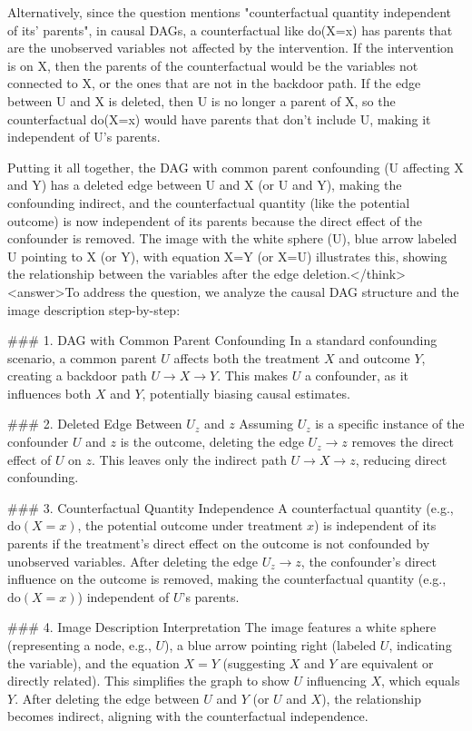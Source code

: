 Alternatively, since the question mentions "counterfactual quantity independent of its' parents", in causal DAGs, a counterfactual like do(X=x) has parents that are the unobserved variables not affected by the intervention. If the intervention is on X, then the parents of the counterfactual would be the variables not connected to X, or the ones that are not in the backdoor path. If the edge between U and X is deleted, then U is no longer a parent of X, so the counterfactual do(X=x) would have parents that don't include U, making it independent of U's parents.

Putting it all together, the DAG with common parent confounding (U affecting X and Y) has a deleted edge between U and X (or U and Y), making the confounding indirect, and the counterfactual quantity (like the potential outcome) is now independent of its parents because the direct effect of the confounder is removed. The image with the white sphere (U), blue arrow labeled U pointing to X (or Y), with equation X=Y (or X=U) illustrates this, showing the relationship between the variables after the edge deletion.</think><answer>To address the question, we analyze the causal DAG structure and the image description step-by-step:  

### 1. DAG with Common Parent Confounding  
In a standard confounding scenario, a common parent \( U \) affects both the treatment \( X \) and outcome \( Y \), creating a backdoor path \( U \rightarrow X \rightarrow Y \). This makes \( U \) a confounder, as it influences both \( X \) and \( Y \), potentially biasing causal estimates.  

### 2. Deleted Edge Between \( U_z \) and \( z \)  
Assuming \( U_z \) is a specific instance of the confounder \( U \) and \( z \) is the outcome, deleting the edge \( U_z \rightarrow z \) removes the direct effect of \( U \) on \( z \). This leaves only the indirect path \( U \rightarrow X \rightarrow z \), reducing direct confounding.  

### 3. Counterfactual Quantity Independence  
A counterfactual quantity (e.g., \( \text{do}(X = x) \), the potential outcome under treatment \( x \)) is independent of its parents if the treatment’s direct effect on the outcome is not confounded by unobserved variables. After deleting the edge \( U_z \rightarrow z \), the confounder’s direct influence on the outcome is removed, making the counterfactual quantity (e.g., \( \text{do}(X = x) \)) independent of \( U \)’s parents.  

### 4. Image Description Interpretation  
The image features a white sphere (representing a node, e.g., \( U \)), a blue arrow pointing right (labeled \( U \), indicating the variable), and the equation \( X = Y \) (suggesting \( X \) and \( Y \) are equivalent or directly related). This simplifies the graph to show \( U \) influencing \( X \), which equals \( Y \). After deleting the edge between \( U \) and \( Y \) (or \( U \) and \( X \)), the relationship becomes indirect, aligning with the counterfactual independence.  

